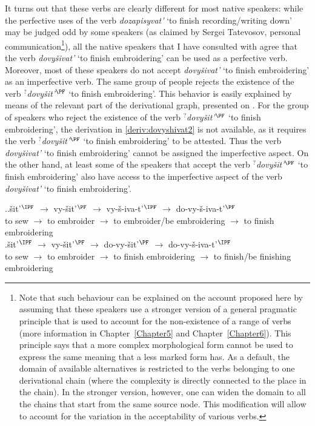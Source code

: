 It turns out that these verbs are clearly different for most native speakers: while the perfective uses of the verb \textit{dozapisyvat'} `to finish recording/writing down' may be judged odd by some speakers (as claimed by Sergei Tatevosov, personal communication\footnote{Note that such behaviour can be explained on the account proposed here by assuming that these speakers use a stronger version of a general pragmatic principle that is used to account for the non-existence of a range of verbs (more information in Chapter~\ref{Chapter5} and Chapter~\ref{Chapter6}). This principle says that a more complex morphological form cannot be used to express the same meaning that a less marked form has. As a default, the domain of available alternatives is restricted to the verbs belonging to one derivational chain (where the complexity is directly connected to the place in the chain). In the stronger version, however, one can widen the domain to all the chains that start from the same source node. This modification will allow to account for the variation in the acceptability of various verbs.}), all the native speakers that I have consulted with agree that the verb \textit{dovy\v{s}ivat'} `to finish embroidering' can be used as a perfective verb. Moreover, most of these speakers do not accept \textit{dovy\v{s}ivat'} `to finish embroidering' as an imperfective verb. The same group of people rejects the existence of the verb $^?$\textit{dovy\v{s}it'}$^{\PF}$ `to finish embroidering'. This behavior is easily explained by means of the relevant part of the derivational graph, presented on . For the group of speakers who reject the existence of the verb $^?$\textit{dovy\v{s}it'}$^{\PF}$ `to finish embroidering', the derivation in \ref{deriv:dovyshivat2} is not available, as it requires the verb $^?$\textit{dovy\v{s}it'}$^{\PF}$ `to finish embroidering' to be attested. Thus the verb \textit{dovy\v{s}ivat'} `to finish embroidering' cannot be assigned the imperfective aspect. On the other hand, at least some of the speakers that accept the verb $^?$\textit{dovy\v{s}it'}$^{\PF}$ `to finish embroidering' also have access to the imperfective aspect of the verb \textit{dovy\v{s}ivat'} `to finish embroidering'.

\ex.\label{deriv:dovyshivat}\ag.\label{deriv:dovyshivat1}\v{s}it'$^{\IPF}$ $\rightarrow$ vy-\v{s}it'$^{\PF}$ $\rightarrow$ vy-\v{s}-iva-t'$^{\IPF}$ $\rightarrow$ do-vy-\v{s}-iva-t'$^{\PF}$\\
{to sew} $\rightarrow$ {to embroider} $\rightarrow$ {to embroider/be embroidering} $\rightarrow$ {to finish embroidering}\\
\bg.\label{deriv:dovyshivat2}\v{s}it'$^{\IPF}$ $\rightarrow$ vy-\v{s}it'$^{\PF}$ $\rightarrow$ do-vy-\v{s}it'$^{\PF}$ $\rightarrow$ do-vy-\v{s}-iva-t'$^{\IPF}$\\
{to sew} $\rightarrow$ {to embroider} $\rightarrow$ {to finish embroidering} $\rightarrow$ {to finish/be finishing embroidering}\\

